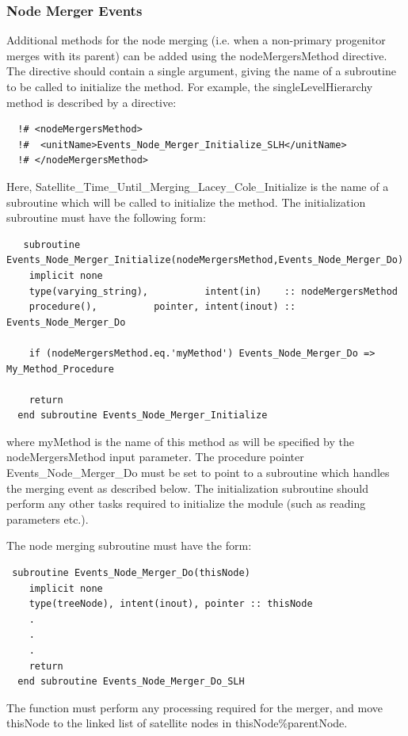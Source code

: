 \subsubsection{Node Merger Events}

Additional methods for the node merging (i.e. when a non-primary progenitor merges with its parent) can be added using the {\normalfont \ttfamily nodeMergersMethod} directive. The directive should contain a single argument, giving the name of a subroutine to be called to initialize the method. For example, the {\normalfont \ttfamily singleLevelHierarchy} method is described by a directive:
\begin{verbatim}
  !# <nodeMergersMethod>
  !#  <unitName>Events_Node_Merger_Initialize_SLH</unitName>
  !# </nodeMergersMethod>
\end{verbatim}
Here, {\normalfont \ttfamily Satellite\_Time\_Until\_Merging\_Lacey\_Cole\_Initialize} is the name of a subroutine which will be called to initialize the method. The initialization subroutine must have the following form:
\begin{verbatim}
   subroutine Events_Node_Merger_Initialize(nodeMergersMethod,Events_Node_Merger_Do)
    implicit none
    type(varying_string),          intent(in)    :: nodeMergersMethod
    procedure(),          pointer, intent(inout) :: Events_Node_Merger_Do

    if (nodeMergersMethod.eq.'myMethod') Events_Node_Merger_Do => My_Method_Procedure

    return
  end subroutine Events_Node_Merger_Initialize
\end{verbatim}
where {\normalfont \ttfamily myMethod} is the name of this method as will be specified by the {\normalfont \ttfamily nodeMergersMethod} input parameter. The procedure pointer {\normalfont \ttfamily Events\_Node\_Merger\_Do} must be set to point to a subroutine which handles the merging event as described below. The initialization subroutine should perform any other tasks required to initialize the module (such as reading parameters etc.).

The node merging subroutine must have the form:
\begin{verbatim}
 subroutine Events_Node_Merger_Do(thisNode)
    implicit none
    type(treeNode), intent(inout), pointer :: thisNode
    .
    .
    .
    return
  end subroutine Events_Node_Merger_Do_SLH
\end{verbatim}
The function must perform any processing required for the merger, and move {\normalfont \ttfamily thisNode} to the linked list of satellite nodes in {\normalfont \ttfamily thisNode\%parentNode}.

